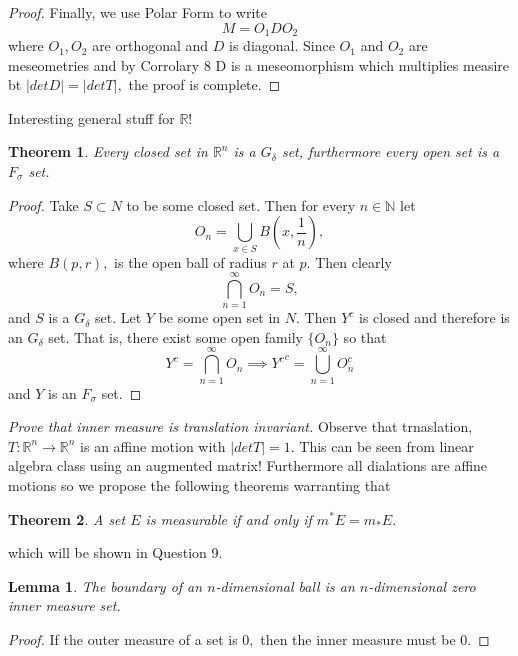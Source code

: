 \documentclass[letter]{article}
\newtheorem{theorem}{Theorem}
\newtheorem{lemma}{Lemma}
\newenvironment{menumerate}{%
  \edef\backupindent{\the\parindent}%
  \enumerate%
  \setlength{\parindent}{\backupindent}%
}{\endenumerate}
\begin{document}
\begin{menumerate}
\begin{proof}
		Finally, we use Polar Form to write
		\begin{equation}
			M = O_1 D O_2
		\end{equation}
		where $O_1, O_2$ are orthogonal and $D$ is diagonal. Since $O_1$ and $O_2$ are meseometries and by Corrolary $8$ D is a meseomorphism which multiplies measire bt $|det D| =|det T|,$ the proof is complete. 
	\end{proof}
	\item Interesting general stuff for $\mathbb{R}!$
	\begin{theorem}
		Every closed set in $\mathbb{R}^n$ is a $G_\delta$ set, furthermore
		every open set is a $F_\sigma$ set.
	\end{theorem}
	\begin{proof}
		Take $S \subset N$ to be some closed set. Then for every $n\in \mathbb{N}$
		let 
		\begin{equation}
			O_n = \bigcup_{x \in S} B\left(x, \frac{1}{n}\right),	
		\end{equation}
		where $B(p,r),$ is the open ball of radius $r$ at $p.$
		Then clearly \begin{equation}
			\bigcap_{n=1}^\infty O_n = S,
		\end{equation}
		and $S$ is a $G_\delta$ set. Let $Y$ be some open set in $N.$ Then
		$Y^c$ is closed and therefore is an $G_\delta$ set. That is, there exist
		some open family $\{O_n\}$ so
		that 
		\begin{equation}
				Y^c = \bigcap_{n=1}^\infty O_n \implies {Y^c}^c = \bigcup_{n=1}^\infty O_n^c
		\end{equation}
		and $Y$ is an $F_\sigma$ set.
	\end{proof}
	\setcounter{enumi}{6}
	\item \emph{Prove that inner measure is translation invariant.}
	Observe that trnaslation, $T: \mathbb{R}^n \to \mathbb{R}^n$ is an affine motion
	with $|det T| = 1.$ This can be seen from linear algebra class using an augmented matrix!
	Furthermore all dialations are affine motions so we propose the following theorems
	warranting that
	\begin{theorem}
		A set $E$ is measurable if and only if $m^*E = m_*E.$
	\end{theorem}
	which will be shown in Question 9.
	\begin{lemma}
		The boundary of an $n$-dimensional ball is an $n$-dimensional zero inner measure set.
	\end{lemma}
	\begin{proof}
		If the outer measure of a set is $0,$ then the inner measure must be $0.$

\end{proof}
\end{menumerate}
\end{document}
